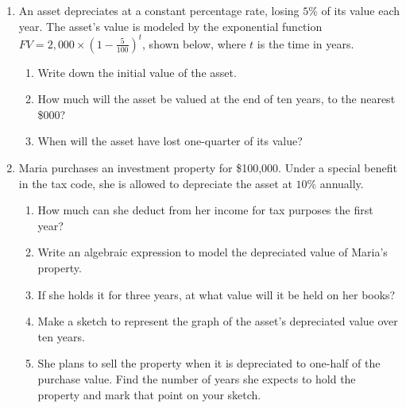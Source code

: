 \documentclass[12pt, twoside]{article}
\begin{document}
\begin{enumerate}
\newpage
\item An asset depreciates at a constant percentage rate, losing $5\%$ of its value each year. The asset's value is modeled by the exponential function $\displaystyle FV=2,000 \times \left( 1-\frac{5}{100} \right)^t$, shown below, where $t$ is the time in years.
\begin{multicols}{2}
    \begin{enumerate}[itemsep=1cm]
        \item Write down the initial value of the asset.
        \item How much will the asset be valued at the end of ten years, to the nearest \$000?
        \item When will the asset have lost one-quarter of its value?
    \end{enumerate}
    \begin{center}
    \end{center}
    \end{multicols}

\item Maria purchases an investment property for \$100,000. Under a special benefit in the tax code, she is allowed to depreciate the asset at $10\%$ annually. 
\begin{enumerate}[itemsep=1cm]
    \item How much can she deduct from her income for tax purposes the first year?
    \item Write an algebraic expression to model the depreciated value of Maria's property.
    \item If she holds it for three years, at what value will it be held on her books?
    \item Make a sketch to represent the graph of the asset's depreciated value over ten years. \vspace{3cm}
    \item She plans to sell the property when it is depreciated to one-half of the purchase value. Find the number of years she expects to hold the property and mark that point on your sketch.
\end{enumerate}
\vspace{2cm}



\end{enumerate}
\end{document}
